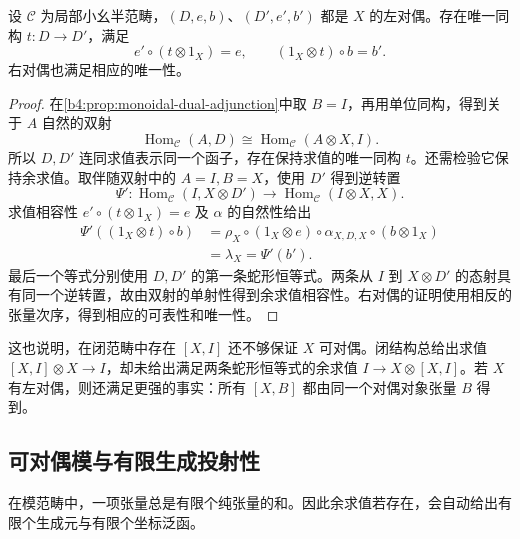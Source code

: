 \begin{corollary}\label{b4:cor:monoidal-dual-unique}
	设 \(\mathcal C\) 为局部小幺半范畴，\((D,e,b)\)、\((D',e',b')\) 都是 \(X\) 的左对偶。存在唯一同构 \(t:D\to D'\)，满足
	\[
		e'\circ(t\otimes1_X)=e, \qquad (1_X\otimes t)\circ b=b'.
	\]
	右对偶也满足相应的唯一性。
\end{corollary}
\begin{proof}
	在\cref{b4:prop:monoidal-dual-adjunction}中取 \(B=I\)，再用单位同构，得到关于 \(A\) 自然的双射
	\[
		\operatorname{Hom}_{\mathcal C}(A,D) \cong\operatorname{Hom}_{\mathcal C}(A\otimes X,I).
	\]
	所以 \(D,D'\) 连同求值表示同一个函子，存在保持求值的唯一同构 \(t\)。还需检验它保持余求值。取伴随双射中的 \(A=I,B=X\)，使用 \(D'\) 得到逆转置
	\[
		\Psi':\operatorname{Hom}_{\mathcal C}(I,X\otimes D') \longrightarrow\operatorname{Hom}_{\mathcal C}(I\otimes X,X).
	\]
	求值相容性 \(e'\circ(t\otimes1_X)=e\) 及 \(\alpha\) 的自然性给出
	\[
		\begin{aligned}
			\Psi'((1_X\otimes t)\circ b) &=\rho_X\circ(1_X\otimes e)\circ\alpha_{X,D,X} \circ(b\otimes1_X)\\
			&=\lambda_X=\Psi'(b').
		\end{aligned}
	\]
	最后一个等式分别使用 \(D,D'\) 的第一条蛇形恒等式。两条从 \(I\) 到 \(X\otimes D'\) 的态射具有同一个逆转置，故由双射的单射性得到余求值相容性。右对偶的证明使用相反的张量次序，得到相应的可表性和唯一性。
\end{proof}

这也说明，在闭范畴中存在 \([X,I]\) 还不够保证 \(X\) 可对偶。闭结构总给出求值 \([X,I]\otimes X\to I\)，却未给出满足两条蛇形恒等式的余求值 \(I\to X\otimes[X,I]\)。若 \(X\) 有左对偶，则还满足更强的事实：所有 \([X,B]\) 都由同一个对偶对象张量 \(B\) 得到。

\subsection{可对偶模与有限生成投射性}
\label{b4:subsec:monoidal-projective-duals}

在模范畴中，一项张量总是有限个纯张量的和。因此余求值若存在，会自动给出有限个生成元与有限个坐标泛函。

